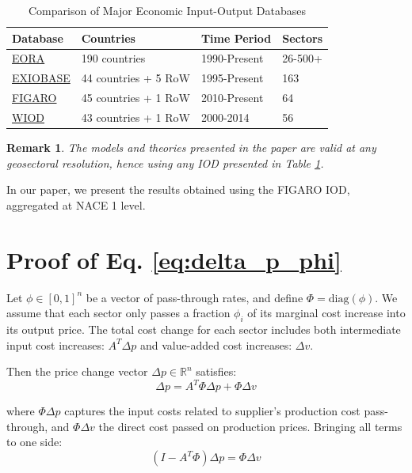 \documentclass{article}
\newtheorem{remark}{Remark}
\begin{document}
\begin{table}[h]
\centering
\begin{tabular}{|l|l|l|l|}
\hline
Database & Countries & Time Period & Sectors \\ \hline
\href{https://worldmrio.com/}{EORA} & 190 countries & 1990-Present & 26-500+ \\ \hline
\href{https://exiobase.eu/}{EXIOBASE} & 44 countries + 5 RoW & 1995-Present & 163 \\ \hline
\href{https://ec.europa.eu/eurostat/web/esa-supply-use-input-tables/database}{FIGARO} & 45 countries + 1 RoW & 2010-Present & 64 \\ \hline
\href{https://www.rug.nl/ggdc/valuechain/wiod/}{WIOD} & 43 countries + 1 RoW & 2000-2014 & 56  \\ \hline
\end{tabular}
\caption{Comparison of Major Economic Input-Output Databases}
\label{tab:iod}
\end{table}

\begin{remark}
    The models and theories presented in the paper are valid at any geosectoral resolution, hence using any IOD presented in Table \ref{tab:iod}. 
\end{remark}

\noindent In our paper, we present the results obtained using the FIGARO IOD, aggregated at NACE 1 level. 


\section{Proof of Eq. \eqref{eq:delta_p_phi}}
\label{appendix:ptr_costpush}

Let $\phi \in [0,1]^n$ be a vector of pass-through rates, and define $\Phi = \mathrm{diag}(\phi)$. We assume that each sector only passes a fraction $\phi_i$ of its marginal cost increase into its output price. The total cost change for each sector includes both intermediate input cost increases: $A^T \Delta p$ and value-added cost increases: $\Delta v$.

Then the price change vector $\Delta p \in \mathbb{R}^n$ satisfies:
\[
\Delta p = A^T \Phi \Delta p + \Phi \Delta v
\]

\noindent where $\Phi \Delta p$ captures the input costs related to supplier's production cost pass-through, and $\Phi \Delta v$ the direct cost passed on production prices.  Bringing all terms to one side:
\[
(I - A^T \Phi) \Delta p = \Phi \Delta v
\]
\end{document}
